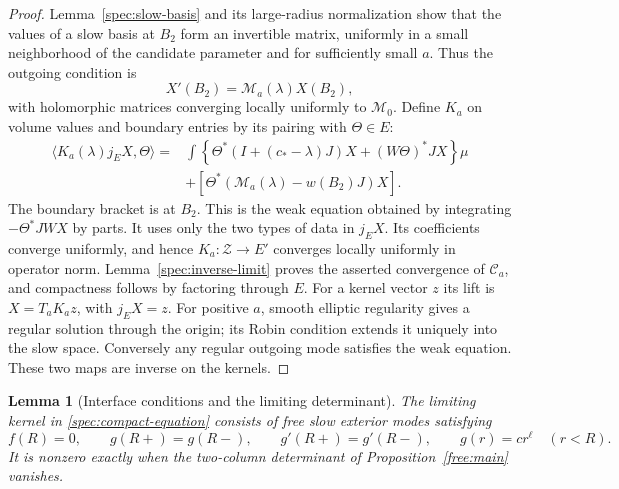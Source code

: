 \documentclass[11pt]{article}
\numberwithin{equation}{section}
\newtheorem{lemma}[theorem]{Lemma}
\theoremstyle{definition}
\theoremstyle{remark}
\begin{document}
\begin{proof}
Lemma~\ref{spec:slow-basis} and its large-radius normalization show
that the values of a slow basis at $B_2$ form an invertible matrix,
uniformly in a small neighborhood of the candidate parameter and
for sufficiently small $a$. Thus the outgoing condition is
\[
 X'(B_2)=\mathcal M_a(\lambda)X(B_2),
\]
with holomorphic matrices converging locally uniformly to
$\mathcal M_0$. Define $K_a$ on volume values and boundary entries
by its pairing with $\Theta\in E$:
\begin{equation}\label{spec:K-form}
 \begin{split}
 \langle K_a(\lambda)j_EX,\Theta\rangle
 ={}&\int\left\{\Theta^*(I+(c_*-\lambda)J)X
                         +(W\Theta)^*JX\right\}\mu\\
 &+[\Theta^*(\mathcal M_a(\lambda)-w(B_2)J)X].
 \end{split}
\end{equation}
The boundary bracket is at $B_2$. This is the weak equation obtained
by integrating $-\Theta^*JW X$ by parts. It uses only the two types
of data in $j_EX$. Its coefficients converge uniformly, and hence
$K_a:\mathscr Z\to E'$ converges locally uniformly in operator norm.
Lemma~\ref{spec:inverse-limit} proves the asserted convergence of
$\mathcal C_a$, and compactness follows by factoring through $E$.
For a kernel vector $z$ its lift is $X=T_aK_a z$, with $j_EX=z$.
For positive $a$, smooth elliptic regularity gives a regular solution
through the origin; its Robin condition extends it uniquely into the
slow space. Conversely any regular outgoing mode satisfies the weak
equation. These two maps are inverse on the kernels.
\end{proof}

\begin{lemma}[Interface conditions and the limiting determinant]
\label{spec:interface}
The limiting kernel in \eqref{spec:compact-equation} consists of free
slow exterior modes satisfying
\begin{equation}\label{spec:matching}
 f(R)=0,\qquad g(R+)=g(R-),\qquad g'(R+)=g'(R-),\qquad
 g(r)=c r^\ell\quad(r<R).
\end{equation}
It is nonzero exactly when the two-column determinant of
Proposition~\ref{free:main} vanishes.
\end{lemma}
\end{document}
